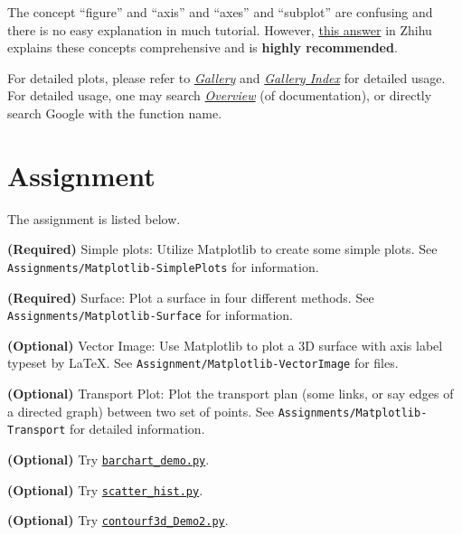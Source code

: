 \documentclass[english]{../TeXTemplate/pkupaper}
\begin{document}
The concept ``figure'' and ``axis'' and ``axes'' and ``subplot'' are confusing and there is no easy explanation in much tutorial. However, \href{https://www.zhihu.com/question/51745620/answer/231113561}{this answer} in Zhihu explains these concepts comprehensive and is \textbf{highly recommended}.

For detailed plots, please refer to \href{https://matplotlib.org/gallery.html}{\emph{Gallery}} and \href{https://matplotlib.org/gallery/index.html}{\emph{Gallery Index}} for detailed usage. For detailed usage, one may search \href{https://matplotlib.org/contents.html}{\emph{Overview}} (of documentation), or directly search Google with the function name.

\section{Assignment}

The assignment is listed below.

\begin{partlist}
\item \textbf{(Required)} Simple plots: Utilize Matplotlib to create some simple plots. See \verb"Assignments/Matplotlib-SimplePlots" for information.
\item \textbf{(Required)} Surface: Plot a surface in four different methods. See \verb"Assignments/Matplotlib-Surface" for information.
\item \textbf{(Optional)} Vector Image: Use Matplotlib to plot a 3D surface with axis label typeset by \LaTeX. See \verb"Assignment/Matplotlib-VectorImage" for files.
\item \textbf{(Optional)} Transport Plot: Plot the transport plan (some links, or say edges of a directed graph) between two set of points. See \verb"Assignments/Matplotlib-Transport" for detailed information.
\item \textbf{(Optional)} Try \href{https://matplotlib.org/examples/api/barchart_demo.html}{\texttt{barchart\_demo.py}}.
\item \textbf{(Optional)} Try \href{https://matplotlib.org/examples/pylab_examples/scatter_hist.html}{\texttt{scatter\_hist.py}}.
\item \textbf{(Optional)} Try \href{https://matplotlib.org/examples/mplot3d/contourf3d_demo2.html}{\texttt{contourf3d\_Demo2.py}}.
\end{partlist}
\end{document}
